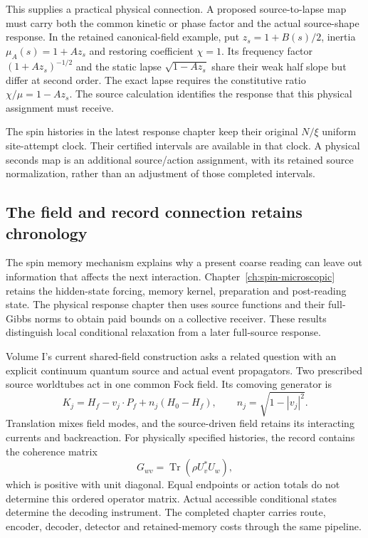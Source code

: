 This supplies a practical physical connection. A proposed source-to-lapse map must carry both the common kinetic or phase factor and the actual source-shape response. In the retained canonical-field example, put $z_s=1+B(s)/2$, inertia $\mu_A(s)=1+Az_s$ and restoring coefficient $\chi=1$. Its frequency factor $(1+Az_s)^{-1/2}$ and the static lapse $\sqrt{1-Az_s}$ share their weak half slope but differ at second order. The exact lapse requires the constitutive ratio $\chi/\mu=1-Az_s$. The source calculation identifies the response that this physical assignment must receive.

The spin histories in the latest response chapter keep their original $N/\xi$ uniform site-attempt clock. Their certified intervals are available in that clock. A physical seconds map is an additional source/action assignment, with its retained source normalization, rather than an adjustment of those completed intervals.

\subsection{The field and record connection retains chronology}

The spin memory mechanism explains why a present coarse reading can leave out information that affects the next interaction. Chapter~\ref{ch:spin-microscopic} retains the hidden-state forcing, memory kernel, preparation and post-reading state. The physical response chapter then uses source functions and their full-Gibbs norms to obtain paid bounds on a collective receiver. These results distinguish local conditional relaxation from a later full-source response.

Volume I's current shared-field construction asks a related question with an explicit continuum quantum source and actual event propagators. Two prescribed source worldtubes act in one common Fock field. Its comoving generator is
\begin{equation}
 K_j=H_f-v_j\cdot P_f+n_j(H_0-H_f),
 \qquad n_j=\sqrt{1-|v_j|^2}.
\end{equation}
Translation mixes field modes, and the source-driven field retains its interacting currents and backreaction. For physically specified histories, the record contains the coherence matrix
\begin{equation}
 G_{wv}=\operatorname{Tr}(\rho U_v^*U_w),
\end{equation}
which is positive with unit diagonal. Equal endpoints or action totals do not determine this ordered operator matrix. Actual accessible conditional states determine the decoding instrument. The completed chapter carries route, encoder, decoder, detector and retained-memory costs through the same pipeline.

